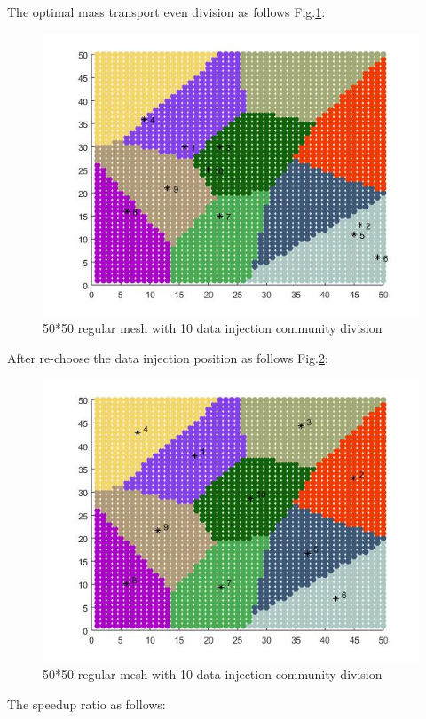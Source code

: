 \vspace*{30pt}
The optimal mass transport even division as follows Fig.\ref{omtcell}:

\begin{figure}[h]
\centering\includegraphics[width=0.8\linewidth]{figure/omtcell}
\caption{50*50 regular mesh with 10 data injection community division}
\label{omtcell}
\end{figure}
\vspace*{30pt}

After re-choose the data injection position as follows Fig.\ref{omtcell2}:
\begin{figure}[h]
\centering\includegraphics[width=0.8\linewidth]{figure/omtcell2}
\caption{50*50 regular mesh with 10 data injection community division}
\label{omtcell2}
\end{figure}

\vspace*{30pt}

The speedup ratio as follows:\\

